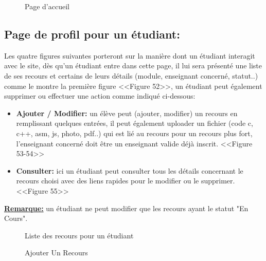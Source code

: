 \documentclass[12pt]{report}
\begin{document}
\newpage

\begin{figure}[h]
\centering
  \hspace*{-0.33in}
\caption{Page d'accueil}
\end{figure}

\subsection{Page de profil pour un étudiant:}

Les quatre figures suivantes porteront sur la manière dont un étudiant interagit avec le site, dès qu'un étudiant entre dans cette page, il lui sera présenté une liste de ses recours et certains de leurs détails (module, enseignant concerné, statut..) comme le montre la première figure <<Figure 52>>, un étudiant peut également supprimer ou effectuer une action comme indiqué ci-dessous:

\begin{itemize}
  \item \textbf{Ajouter / Modifier:} un élève peut (ajouter, modifier) un recours en remplissant quelques entrées, il peut également uploader un fichier (code c, c++, asm, js, photo, pdf..) qui est lié au recours pour un recours plus fort, l'enseignant concerné doit être un enseignant valide déjà inscrit. <<Figure 53-54>>
  \item \textbf{Consulter:} ici un étudiant peut consulter tous les détails concernant le recours choisi avec des liens rapides pour le modifier ou le supprimer. <<Figure 55>>
\end{itemize}
\textbf{\uline{Remarque:}} un étudiant ne peut modifier que les recours ayant le statut "En Cours".

\newpage

\begin{figure}[H]
\centering
  \vspace*{-0.4in}
  \hspace*{-0.1in}
\caption{Liste des recours pour un étudiant}
\end{figure}

\begin{figure}[H]
\centering
  \vspace*{0.05in}
  \hspace*{-0.1in}
\caption{Ajouter Un Recours}
  \vspace*{-0.1in}
\end{figure}
\end{document}
